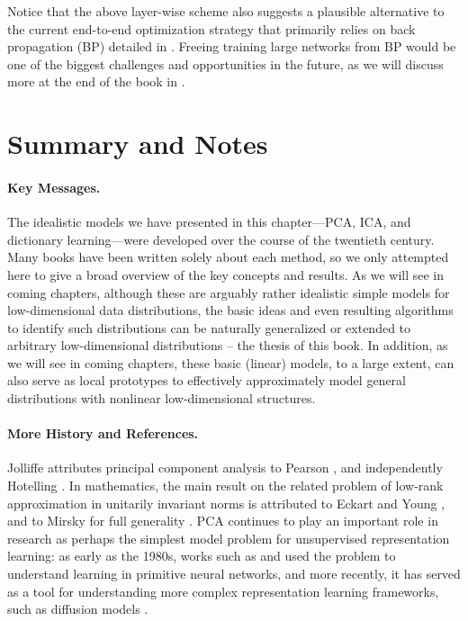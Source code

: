 \documentclass[../../book-main.tex]{subfiles}
\begin{document}
Notice that the above layer-wise scheme also suggests a plausible
alternative to the current end-to-end optimization strategy that
primarily relies on back propagation (BP) detailed in
. Freeing training large networks from BP would
be one of the biggest challenges and opportunities in the future, as
we will discuss more at the end of the book in .

\section{Summary and Notes}

\paragraph{Key Messages.} The idealistic models we have presented in
this chapter---PCA, ICA, and
dictionary learning---were developed over the course of the twentieth century.
Many books have been written solely about each method, so we only attempted
here to give a broad overview of the key concepts and results. As we
will see in coming chapters, although these are arguably rather
idealistic simple models for low-dimensional data distributions, the
basic ideas and even resulting algorithms to identify such
distributions can be naturally generalized or extended to arbitrary
low-dimensional distributions -- the thesis of this book. In
addition, as we will see in coming chapters, these basic (linear)
models, to a large extent, can also serve as local prototypes to
effectively approximately model general distributions with nonlinear
low-dimensional structures.

\paragraph{More History and References.}
Jolliffe \cite{Jolliffe1986} attributes principal component analysis to Pearson
\cite{Pearson1901}, and independently Hotelling \cite{Hotelling1933}. In
mathematics, the main result on the related problem of low-rank approximation in
unitarily invariant norms is attributed to Eckart and Young
\cite{Eckart1936-ep}, and to Mirsky for full generality \cite{Mirsky1960-ek}.
PCA continues to play an important role in research as perhaps the simplest
model problem for unsupervised representation learning: as early as the 1980s,
works such as \textcite{Oja1982SimplifiedNM} and \textcite{Baldi89} used the
problem to understand learning in primitive neural networks, and more recently,
it has served as a tool for understanding more complex representation learning
frameworks, such as diffusion models \cite{wang2024diffusion}.
\end{document}
